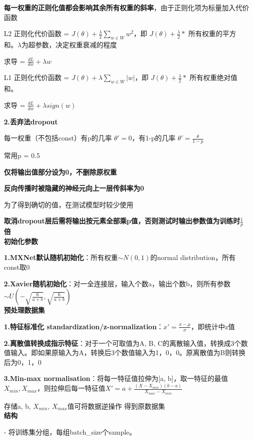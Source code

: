 \documentclass[UTF8]{ctexart}
\begin{document}
  \quad \textbf{每一权重的正则化值都会影响其余所有权重的斜率}，由于正则化项为标量加入代价函数

  \quad L2 正则化代价函数 = $J(\theta) + \frac{\lambda}{2}\sum_{w\in W}w^2$，即 $J(\theta) + \frac{\lambda}{2} * $ 所有权重的平方和。$\lambda$为超参数，决定权重衰减的程度

  \quad \quad 求导 = $\frac{dL}{dw} + \lambda w$
  
  \quad L1 正则化代价函数 = $J(\theta) + \lambda \sum_{w\in W} |w|$，即 $J(\theta) + \frac{\lambda}{2} * $ 所有权重绝对值和。

  \quad \quad 求导 = $\frac{dL}{dw} + \lambda sign(w)$

  \textbf{2.丢弃法dropout}

  \quad 每一权重（不包括const）有p的几率 $\theta' = 0$，有1-p的几率 $\theta' = \frac{\theta}{1-p}$

  \quad \quad 常用p = 0.5

  \quad \quad \textbf{仅将输出值部分设为0，不删除原权重}

  \quad \quad \textbf{反向传播时被隐藏的神经元向上一层传斜率为0}

  \quad 为了得到确切的值，在测试模型时较少使用
  
  \quad \quad \textbf{取消dropout层后需将输出按元素全部乘p值，否则测试时输出参数值为训练时$\frac{1}{p}$倍}\\
\textbf{初始化参数}

  \textbf{1.MXNet默认随机初始化}：所有权重$\sim N(0, 1)$的normal distribution，所有const取0

  \textbf{2.Xavier随机初始化}：对一全连接层，输入个数a，输出个数b，则所有参数$\sim U(-\sqrt{\frac{6}{a+b}}, \sqrt{\frac{6}{a+b}})$\\
\textbf{预处理数据集}

  \textbf{1.特征标准化 standardization/z-normalization}：$x' = \frac{x - \mu}{\sigma}$，即统计中z值

  \textbf{2.离散值转换成指示特征}：对于一个可取值为A, B, C的离散输入值，转换成3个数值输入。即如果原输入为A，转换后3个数值输入为1，0，0。原离散值为B则转换后为0，1，0
  
  \textbf{3.Min-max normalisation}：将每一特征值拉伸为[a, b]，取一特征的最值$X_{min}, X_{max}$，则拉伸后每一特征值$X' = a + \frac{(X - X_{min})(b - a)}{X_{max} - X_{min}}$
  
  \quad 存储a, b, $X_{min}$, $X_{max}$值可将数据逆操作 得到原数据集\\
\textbf{结构}
  
  - 将训练集分组，每组batch\_size个sample。
  
\end{document}
